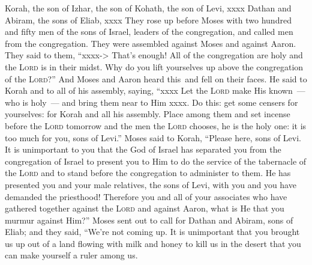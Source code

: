 
\begin{inparaenum}
   Korah, the son of Izhar, the son of Kohath, the son of Levi, xxxx Dathan and Abiram, the sons of Eliab, xxxx%
   They rose up before Moses with two hundred and fifty men of the sons of Israel, leaders of the congregation, and called men from the congregation.%
   They were assembled against Moses and against Aaron. They said to them, ``xxxx-> That's enough! All of the congregation are holy and the \textsc{Lord} is in their midst. Why do you lift yourselves up above the congregation of the \textsc{Lord}?''%
   And Moses and Aaron heard this\understood\ and fell on their faces.%
   He said to Korah and to all of his assembly, saying, ``xxxx Let the \textsc{Lord} make His known~--- who is holy~--- and bring them near to Him xxxx.%
   Do this: get some censers for yourselves: for Korah and all his assembly.%
   Place among them and set incense before the \textsc{Lord} tomorrow and the men the \textsc{Lord} chooses, he is the holy one: it is too much for you, sons of Levi.''%
   Moses said to Korah, ``Please here, sons of Levi.%
   It is unimportant to you that the God of Israel has separated you from the congregation of Israel to present you to Him to do the service of the tabernacle of the \textsc{Lord} and to stand before the congregation to administer to them.%
   He has presented you and your male relatives, the sons of Levi, with you and you have demanded the priesthood!%
   Therefore you and all of your associates who have gathered together against the \textsc{Lord} and against Aaron, what is He that you murmur against Him?''%
   Moses sent out to call for Dathan and Abiram, sons of Eliab; and they said, ``We're not coming up.%
   It is unimportant that you brought us up out of a land flowing with milk and honey to kill us in the desert that you can make yourself a ruler among us.%

\end{inparaenum}
